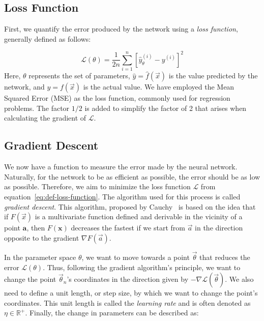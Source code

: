 \subsection{Loss Function}

First, we quantify the error produced by the network using a \emph{loss function}, generally defined as follows:

\begin{equation}
\label{eq:def-loss-function}
\mathcal{L}(\theta) = \frac{1}{2n} \sum_{i=1}^n \left[\hat{y}_{\theta}^{(i)} - y^{(i)}\right]^2
\end{equation}
Here, $\theta$ represents the set of parameters, $\hat{y} = \hat{f}(\Vec{x})$ is the value predicted by the network, and $y=f(\Vec{x})$ is the actual value. We have employed the Mean Squared Error (MSE) as the loss function, commonly used for regression problems. The factor $1/2$ is added to simplify the factor of 2 that arises when calculating the gradient of $\mathcal{L}$.

\subsection{Gradient Descent}\label{subsec:gradient-descent}

We now have a function to measure the error made by the neural network. Naturally, for the network to be as efficient as possible, the error should be as low as possible. Therefore, we aim to minimize the loss function $\mathcal{L}$ from equation~\eqref{eq:def-loss-function}. The algorithm used for this process is called \emph{gradient descent}. This algorithm, proposed by Cauchy~\cite{cauchymethode} is based on the idea that if $F(\Vec{x})$ is a multivariate function defined and derivable in the vicinity of a point $\mathbf {a}$, then $ F(\mathbf {x} )$ decreases the fastest if we start from $\Vec{a}$ in the direction opposite to the gradient $\nabla F(\Vec{a})$.

In the parameter space $\theta$, we want to move towards a point $\Vec{\theta}$ that reduces the error $\mathcal{L}\left( \theta \right)$. Thus, following the gradient algorithm's principle, we want to change the point $\Vec{\theta}_{n}$'s coordinates in the direction given by $-\nabla \mathcal{L}(\Vec{\theta})$. We also need to define a unit length, or step size, by which we want to change the point's coordinates. This unit length is called the \emph{learning rate} and is often denoted as $\eta \in \mathbb{R}^+$. Finally, the change in parameters can be described as:

